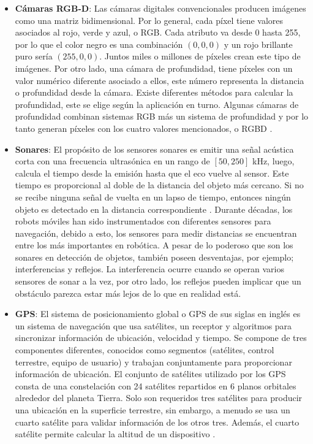 \begin{itemize}
    \item \textbf{Cámaras RGB-D}: Las cámaras digitales convencionales producen imágenes como una matriz bidimensional. Por lo general, cada píxel tiene valores asociados al rojo, verde y azul, o RGB. Cada atributo va desde 0 hasta 255, por lo que el color negro es una combinación $(0, 0, 0)$ y un rojo brillante puro sería $(255, 0, 0)$. Juntos miles o millones de píxeles crean este tipo de imágenes. Por otro lado, una cámara de profundidad, tiene píxeles con un valor numérico diferente asociado a ellos, este número representa la distancia o profundidad desde la cámara. 
    Existe diferentes métodos para calcular la profundidad, este se elige según la aplicación en turno. Algunas cámaras de profundidad combinan sistemas RGB más un sistema de profundidad y por lo tanto generan píxeles con los cuatro valores mencionados, o RGBD \cite{cameraRGBD}.
    
    \item \textbf{Sonares}: El propósito de los sensores sonares es emitir una señal acústica corta con una frecuencia ultrasónica en un rango de $[50, 250]$ kHz, luego, calcula el tiempo desde la emisión hasta que el eco vuelve al sensor. Este tiempo es proporcional al doble de la distancia del objeto más cercano. Si no se recibe ninguna señal de vuelta en un lapso de tiempo, entonces ningún objeto es detectado en la distancia correspondiente \cite{braunl2003embedded}. 
    Durante décadas, los robots móviles han sido instrumentados con diferentes sensores para navegación, debido a esto, los sensores para medir distancias se encuentran entre los más importantes en robótica. A pesar de lo poderoso que son los sonares en detección de objetos, también poseen desventajas, por ejemplo; interferencias y reflejos. La interferencia ocurre cuando se operan varios sensores de sonar a la vez, por otro lado, los reflejos pueden implicar que un obstáculo parezca estar más lejos de lo que en realidad está.
    
    \item \textbf{GPS}: El sistema de posicionamiento global o GPS de sus siglas en inglés es un sistema de navegación que usa satélites, un receptor y algoritmos para sincronizar información de ubicación, velocidad y tiempo. Se compone de tres componentes diferentes, conocidos como segmentos (satélites, control terrestre, equipo de usuario) y trabajan conjuntamente para proporcionar información de ubicación. El conjunto de satélites utilizado por los GPS consta de una constelación con 24 satélites repartidos en 6 planos orbitales alrededor del planeta Tierra. Solo son requeridos tres satélites para producir una ubicación en la superficie terrestre, sin embargo, a menudo se usa un cuarto satélite para validar información de los otros tres. Además, el cuarto satélite permite calcular la altitud de un dispositivo \cite{gps}.


\end{itemize}
